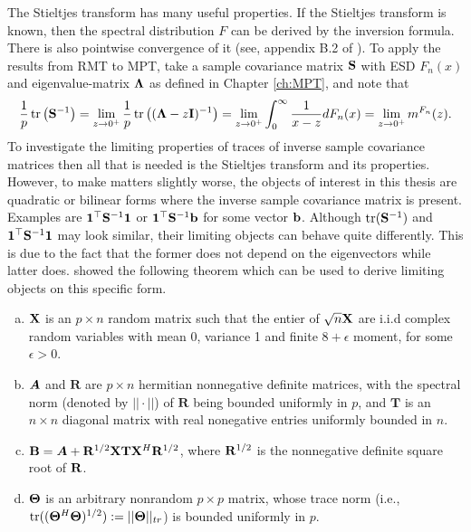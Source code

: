 \documentclass[12pt, oneside]{book}\usepackage{knitr}
\begin{document}
{The Stieltjes transform has many useful properties. 
If the Stieltjes transform is known, then the spectral distribution $F$ can be derived by the inversion formula. 
There is also pointwise convergence of it (see, appendix B.2 of \citet{bai2010spectral}). 
To apply the results from RMT to MPT, take a sample covariance matrix $\mathbf{S}$ with ESD $F_n(x)$ and eigenvalue-matrix $\boldsymbol{\Lambda}$ as defined in Chapter \ref{ch:MPT}, and note that
\begin{equation}
\frac{1}{p}\operatorname{tr} \left( \mathbf{S}^{-1} \right) = \lim_{z\rightarrow 0^+} \frac{1}{p} \operatorname{tr} \left( (\boldsymbol{\Lambda} -z\mathbf{I})^{-1} \right) = \lim_{z\rightarrow 0^+} \int_0^\infty \frac{1}{x - z} dF_n(x) = \lim_{z\rightarrow 0^+} m^{F_n}(z).
\end{equation}
To investigate the limiting properties of traces of inverse sample covariance matrices then all that is needed is the Stieltjes transform and its properties. 
However, to make matters slightly worse, the objects of interest in this thesis are quadratic or bilinear forms where the inverse sample covariance matrix is present. 
Examples are $\mathbf{1}^\top \mathbf{S}^{-1} \mathbf{1}$ or $\mathbf{1}^\top \mathbf{S}^{-1} \mathbf{b}$ for some vector $\mathbf{b}$. 
Although $\operatorname{tr}(\mathbf{S}^{-1})$ and $\mathbf{1}^\top \mathbf{S}^{-1} \mathbf{1}$ may look similar, their limiting objects can behave quite differently. 
This is due to the fact that the former does not depend on the eigenvectors while latter does. 
\citet{rubio2011spectral} showed the following theorem which can be used to derive limiting objects on this specific form.
\begin{theorem}\label{thm:rubio}


\begin{enumerate}[(a)]
  \item $\mathbf{X}$ is an $p \times n$ random matrix such that the entier of $\sqrt{n}\mathbf{X}$ are i.i.d complex random variables with mean 0, variance 1 and finite $8+\epsilon$ moment, for some $\epsilon > 0$.
  \item $\mbox{\boldmath$A$}$ and $\mathbf{R}$ are $p \times n$ hermitian nonnegative definite matrices, with the spectral norm (denoted by $||\cdot||$) of $\mathbf{R}$ being bounded uniformly in $p$, and $\mathbf{T}$ is an $n \times n$ diagonal matrix with real nonegative entries  uniformly bounded in $n$.
  \item $\mathbf{B}=\mbox{\boldmath$A$} + \mathbf{R}^{1/2} \mathbf{X} \mathbf{T} \mathbf{X}^H \mathbf{R}^{1/2}$, where $\mathbf{R}^{1/2}$ is the nonnegative definite square root of $\mathbf{R}$.
  \item $\mathbf{\Theta}$ is an arbitrary nonrandom $p \times p$ matrix, whose trace norm (i.e., $\operatorname{tr}((\mathbf{\Theta}^H \mathbf{\Theta})^{1/2}):=||\mathbf{\Theta}||_{tr}$) is bounded uniformly in $p$.
\end{enumerate}


\end{theorem}}
\end{document}
